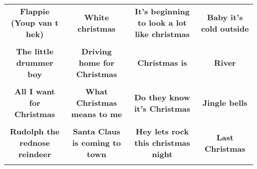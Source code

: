 \documentclass[12pt]{article} \usepackage{eso-pic, graphicx}
\newcommand{\background}[1]{%
\AddToShipoutPictureBG*{\texttt{[image: \#1]}}
}
\begin{document}
\tabcolsep=30.2pt \renewcommand{\arraystretch}{4.5}   \vspace*{4.3cm} \begin{center}  \begin{tabular}{c c c c}
\parbox{3cm}{\centering \textbf{Flappie (Youp van t hek)}}& 
\parbox{3cm}{\centering \textbf{White christmas}}& 
\parbox{3cm}{\centering \textbf{It’s beginning to look a lot like christmas}}& 
\parbox{3cm}{\centering \textbf{Baby it’s cold outside}}\\ \\ 
\parbox{3cm}{\centering \textbf{The little drummer boy}}& 
\parbox{3cm}{\centering \textbf{Driving home for Christmas}}& 
\parbox{3cm}{\centering \textbf{Christmas is}}& 
\parbox{3cm}{\centering \textbf{River}}\\ \\ 
\parbox{3cm}{\centering \textbf{All I want for Christmas}}& 
\parbox{3cm}{\centering \textbf{What Christmas means to me}}& 
\parbox{3cm}{\centering \textbf{Do they know it's Christmas}}& 
\parbox{3cm}{\centering \textbf{Jingle bells}}\\ \\ 
\parbox{3cm}{\centering \textbf{Rudolph the rednose reindeer}}& 
\parbox{3cm}{\centering \textbf{Santa Claus is coming to town}}& 
\parbox{3cm}{\centering \textbf{Hey lets rock this christmas night}}& 
\parbox{3cm}{\centering \textbf{Last Christmas}}\\ \\ 
\end{tabular} \background{discobingo.pdf} \end{center} 
\end{document}
